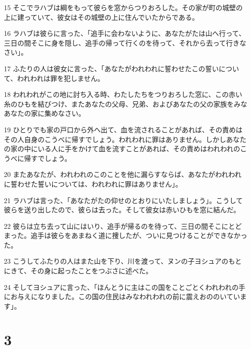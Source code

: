 \par 15 そこでラハブは綱をもって彼らを窓からつりおろした。その家が町の城壁の上に建っていて、彼女はその城壁の上に住んでいたからである。
\par 16 ラハブは彼らに言った、「追手に会わないように、あなたがたは山へ行って、三日の間そこに身を隠し、追手の帰って行くのを待って、それから去って行きなさい」。
\par 17 ふたりの人は彼女に言った、「あなたがわれわれに誓わせたこの誓いについて、われわれは罪を犯しません。
\par 18 われわれがこの地に討ち入る時、わたしたちをつりおろした窓に、この赤い糸のひもを結びつけ、またあなたの父母、兄弟、およびあなたの父の家族をみなあなたの家に集めなさい。
\par 19 ひとりでも家の戸口から外へ出て、血を流されることがあれば、その責めはその人自身のこうべに帰すでしょう。われわれに罪はありません。しかしあなたの家の中にいる人に手をかけて血を流すことがあれば、その責めはわれわれのこうべに帰すでしょう。
\par 20 またあなたが、われわれのこのことを他に漏らすならば、あなたがわれわれに誓わせた誓いについては、われわれに罪はありません」。
\par 21 ラハブは言った、「あなたがたの仰せのとおりにいたしましょう」。こうして彼らを送り出したので、彼らは去った。そして彼女は赤いひもを窓に結んだ。
\par 22 彼らは立ち去って山にはいり、追手が帰るのを待って、三日の間そこにとどまった。追手は彼らをあまねく道に捜したが、ついに見つけることができなかった。
\par 23 こうしてふたりの人はまた山を下り、川を渡って、ヌンの子ヨシュアのもとにきて、その身に起ったことをつぶさに述べた。
\par 24 そしてヨシュアに言った、「ほんとうに主はこの国をことごとくわれわれの手にお与えになりました。この国の住民はみなわれわれの前に震えおののいています」。

\chapter{3}

